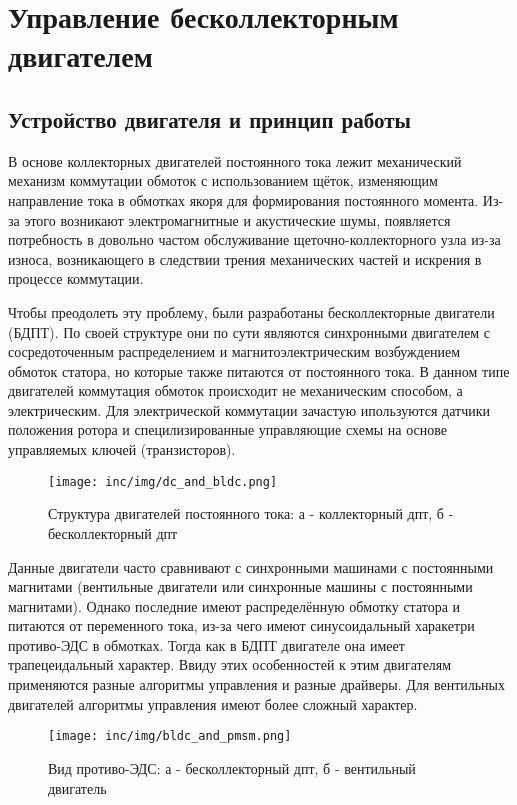 \chapter{Управление бесколлекторным двигателем}
\label{cha:chap1}

\section{Устройство двигателя и принцип работы}
\label{sec:bldc_theory}

В основе коллекторных двигателей постоянного тока лежит механический механизм коммутации обмоток с использованием щёток, изменяющим направление тока в обмотках якоря для формирования постоянного момента. Из-за этого возникают электромагнитные и акустические шумы, появляется потребность в довольно частом обслуживание щеточно-коллекторного узла из-за износа, возникающего в следствии трения механических частей и искрения в процессе коммутации. \cite{book.kim_motors}

Чтобы преодолеть эту проблему, были разработаны бесколлекторные двигатели (БДПТ). По своей структуре они по сути являются синхронными двигателем с сосредоточенным распределением и магнитоэлектрическим возбуждением обмоток статора, но которые также питаются от постоянного тока. В данном типе двигателей коммутация обмоток происходит не механическим способом, а электрическим. Для электрической коммутации зачастую ипользуются датчики положения ротора и специлизированные управляющие схемы на основе управляемых ключей (транзисторов). \cite{book.itmo_motors,book.kim_motors}

\begin{figure}[!h]
\centering
\texttt{[image: inc/img/dc\_and\_bldc.png]}
\caption{Структура двигателей постоянного тока: а - коллекторный дпт, б - бесколлекторный дпт \cite{book.bldc_dummy}}
\end{figure}

Данные двигатели часто сравнивают с синхронными машинами с постоянными магнитами (вентильные двигатели или синхронные машины с постоянными магнитами). Однако последние имеют распределённую обмотку статора и питаются от переменного тока, из-за чего имеют синусоидальный харакетри противо-ЭДС в обмотках. Тогда как в БДПТ двигателе она имеет трапецеидальный характер. Ввиду этих особенностей к этим двигателям применяются разные алгоритмы управления и разные драйверы. Для вентильных двигателей алгоритмы управления имеют более сложный характер.

\begin{figure}[!h]
\centering
\texttt{[image: inc/img/bldc\_and\_pmsm.png]}
\caption{Вид противо-ЭДС: а - бесколлекторный дпт, б - вентильный двигатель \cite{book.kim_motors}}
\end{figure}

